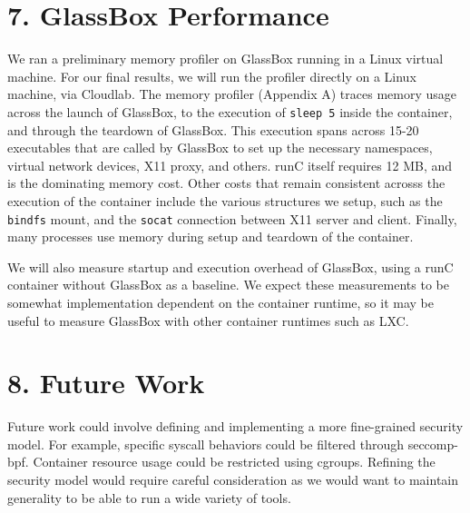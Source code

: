 \documentclass{proc}
\begin{document}
\section*{7. GlassBox Performance}

We ran a preliminary memory profiler on GlassBox running in a Linux virtual machine. For our final results, we will run the profiler directly on a Linux machine, via Cloudlab. The memory profiler (Appendix A) traces memory usage across the launch of GlassBox, to the execution of \texttt{sleep 5} inside the container, and through the teardown of GlassBox. This execution spans across 15-20 executables that are called by GlassBox to set up the necessary namespaces, virtual network devices, X11 proxy, and others. runC itself requires 12 MB, and is the dominating memory cost. Other costs that remain consistent acrosss the execution of the container include the various structures we setup, such as the \texttt{bindfs} mount, and the \texttt{socat} connection between X11 server and client. Finally, many processes use memory during setup and teardown of the container.

We will also measure startup and execution overhead of GlassBox, using a runC container without GlassBox as a baseline. We expect these measurements to be somewhat implementation dependent on the container runtime, so it may be useful to measure GlassBox with other container runtimes such as LXC.

\section*{8. Future Work}
Future work could involve defining and implementing a more fine-grained security model. For example, specific syscall behaviors could be filtered through seccomp-bpf. Container resource usage could be restricted using cgroups.
Refining the security model would require careful consideration as we would want to maintain generality to be able to run a wide variety of tools.
\end{document}
